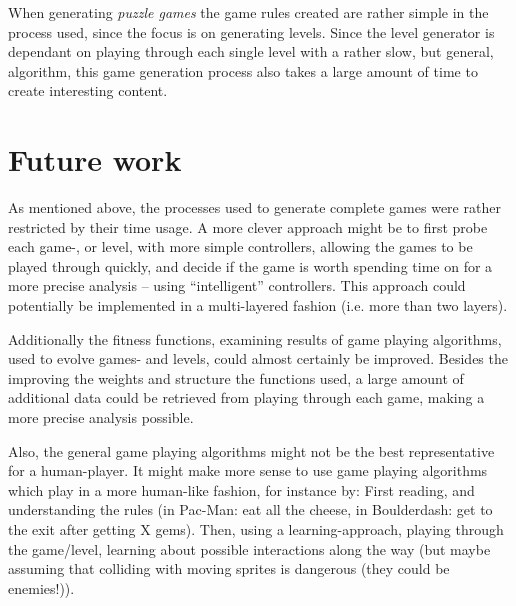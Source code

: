 \documentclass[a4paper,titlepage,final]{report}
\begin{document}
When generating \textit{puzzle games} the game rules created are rather simple in the process used, since the focus is on generating levels.
Since the level generator is dependant on playing through each single level with a rather slow, but general, algorithm, this game generation process also takes a large amount of time to create interesting content.




\section{Future work}
As mentioned above, the processes used to generate complete games were rather restricted by their time usage.
A more clever approach might be to first probe each game-, or level, with more simple controllers, allowing the games to be played through quickly, and decide if the game is worth spending time on for a more precise analysis -- using ``intelligent'' controllers.
This approach could potentially be implemented in a multi-layered fashion (i.e. more than two layers).

Additionally the fitness functions, examining results of game playing algorithms, used to evolve games- and levels, could almost certainly be improved.
Besides the improving the weights and structure the functions used, a large amount of additional data could be retrieved from playing through each game, making a more precise analysis possible.


Also, the general game playing algorithms might not be the best representative for a human-player.
It might make more sense to use game playing algorithms which play in a more human-like fashion, for instance by:
First reading, and understanding the rules (in Pac-Man: eat all the cheese, in Boulderdash: get to the exit after getting X gems).
Then, using a learning-approach, playing through the game/level, learning about possible interactions along the way (but maybe assuming that colliding with moving sprites is dangerous (they could be enemies!)).


\end{document}

